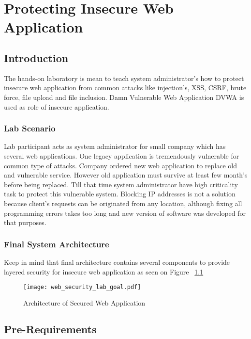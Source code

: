 \chapter{Protecting Insecure Web Application}
\label{Protecting Insecure Web Application}
\section{Introduction}

The hands-on laboratory is mean to teach system administrator's how to protect insecure web application from common attacks like injection's, \gls{XSS}, \gls{CSRF}, brute force, file upload and file inclusion. Damn Vulnerable Web Application \gls{DVWA} is used as role of insecure application.


\subsection{Lab Scenario}
Lab participant acts as system administrator for small company which has several web applications. One legacy application is tremendously vulnerable for common type of attacks. Company ordered new web application to replace old and vulnerable service. However old application must survive at least few month's before being replaced. Till that time system administrator have high criticality task  to protect this vulnerable system. Blocking IP addresses is not a solution because client's requests can be originated from any location, although fixing all programming errors takes too long and new version of software was developed for that purposes.

\subsection{Final System Architecture} 
Keep in mind that final architecture contains several components to provide layered security for insecure web application as seen on Figure ~\ref{Architecture of Secured Web Application}

\begin{figure}[H] 
 \centering 
 \texttt{[image: web\_security\_lab\_goal.pdf]} 
 \caption{Architecture of Secured Web Application} 
 \label{Architecture of Secured Web Application} 
\end{figure}


\section{Pre-Requirements} 
